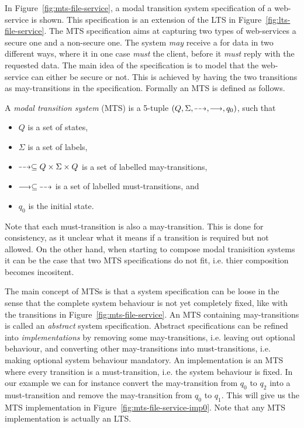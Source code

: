 In Figure~\ref{fig:mts-file-service}, a modal transition system specification of a web-service is shown. This specification is an extension of the LTS in Figure~\ref{fig:lts-file-service}. The MTS specification aims at capturing two types of web-services a secure one and a non-secure one. The system \emph{may} receive a  for data in two different ways, where it in one case \emph{must}  the client, before it \emph{must} reply with the requested data. The main idea of the specification is to model that the web-service can either be secure or not. This is achieved by having the two  transitions as may-transitions in the specification. 
Formally an MTS is defined as follows.

\begin{definition}
    A \emph{modal transition system} (MTS) is a 5-tuple $(Q,\Sigma,\may{},\must{},q_0)$, such that
    \begin{itemize}
        \item $Q$ is a set of states,
        \item $\Sigma$ is a set of labels,
        \item $\may{} \subseteq Q \times \Sigma \times Q$ is a set of labelled may-transitions,
        \item $\must{} \subseteq\; \may{}$ is a set of labelled must-transitions, and
        \item $q_0$ is the initial state.
    \end{itemize}
\end{definition}  

Note that each must-transition is also a may-transition. This is done for consistency, as it unclear what it means if a transition is required but not allowed. On the other hand, when starting to compose modal tranisition systems it can be the case that two MTS specifications do not fit, i.e. thier composition becomes incositent.

The main concept of MTSs is that a system specification can be loose in the sense that the complete system behaviour is not yet completely fixed, like with the  transitions in Figure~\ref{fig:mts-file-service}. An MTS containing may-transitions is called an \emph{abstract} system specification. Abstract specifications can be refined into \emph{implementations} by removing some may-transitions, i.e. leaving out optional behaviour, and converting other may-transitions into must-transitions, i.e. making optional system behaviour mandatory. An implementation is an MTS where every transition is a must-transition, i.e. the system behaviour is fixed. In our example we can for instance convert the may-transition  from $q_0$ to $q_2$ into a must-transition and remove the may-transition  from $q_0$ to $q_1$. This will give us the MTS implementation in Figure~\ref{fig:mts-file-service-imp0}. 
Note that any MTS implementation is actually an LTS. 

